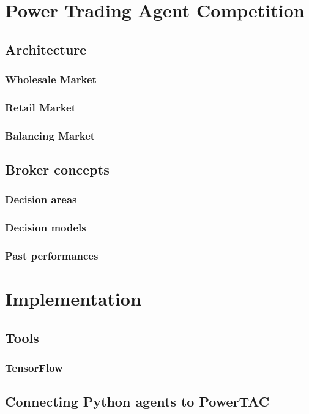 \chapter{Power Trading Agent Competition}
\section{Architecture}
\subsection{Wholesale Market}
\subsection{Retail Market}
\subsection{Balancing Market}

\section{Broker concepts}
\subsection{Decision areas}
\subsection{Decision models}
\subsection{Past performances}



\chapter{Implementation}
\section{Tools}
\subsection{TensorFlow}
\section{Connecting Python agents to PowerTAC}
